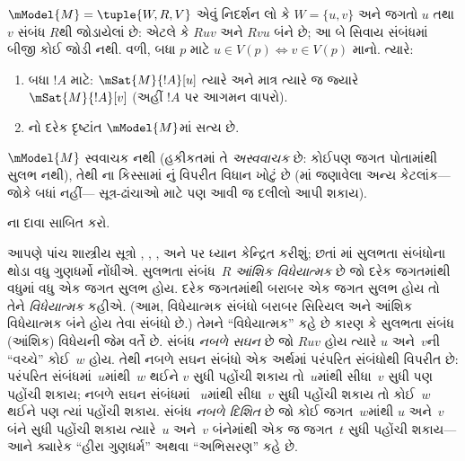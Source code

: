 \begin{prop}
  $\mModel{M} = \tuple{W, R, V}$ એવું નિદર્શન
  લો કે $W = \{u, v
  \}$ અને જગતો $u$ તથા $v$ સંબંધ $R$થી
  જોડાયેલાં છે: એટલે કે $Ruv$ અને $Rvu$ બંને છે;
  આ બે સિવાય સંબંધમાં બીજી કોઈ જોડી નથી.
  વળી, બધા $p$ માટે $u \in V(p) \Leftrightarrow v
  \in V(p)$ માનો. ત્યારે:
  \begin{enumerate}
  \item બધા $!A$ માટે: $\mSat{M}{!A}[u]$ ત્યારે અને માત્ર ત્યારે
    જ જ્યારે $\mSat{M}{!A}[v]$ (અહીં $!A$ પર આગમન વાપરો).
  \item {}નો દરેક દૃષ્ટાંત $\mModel{M}$માં સત્ય છે.
  \end{enumerate}
  $\mModel{M}$ સ્વવાચક નથી (હકીકતમાં તે
  \emph{અસ્વવાચક} છે: કોઈપણ જગત પોતામાંથી સુલભ નથી),
  તેથી ના કિસ્સામાં
  નું વિપરીત વિધાન ખોટું છે
  (માં જણાવેલા અન્ય કેટલાંક---જોકે બધાં નહીં---
  સૂત્ર-ઢાંચાઓ માટે પણ આવી જ દલીલો આપી શકાય).
\end{prop}

\begin{prob}
  ના દાવા સાબિત કરો.
\end{prob}

આપણે પાંચ શાસ્ત્રીય સૂત્રો ,
, ,  અને  પર ધ્યાન કેન્દ્રિત
કરીશું; છતાં માં સુલભતા
સંબંધોના થોડા વધુ ગુણધર્મો નોંધીએ. સુલભતા
સંબંધ~$R$ \emph{આંશિક વિધેયાત્મક} છે જો દરેક
જગતમાંથી વધુમાં વધુ એક જગત સુલભ હોય. દરેક
જગતમાંથી બરાબર એક જગત સુલભ હોય તો તેને
\emph{વિધેયાત્મક} કહીએ. (આમ, વિધેયાત્મક સંબંધો
બરાબર સિરિયલ અને આંશિક વિધેયાત્મક બંને હોય
તેવા સંબંધો છે.) તેમને ``વિધેયાત્મક'' કહે છે કારણ કે
સુલભતા સંબંધ (આંશિક) વિધેયની જેમ વર્તે છે.
સંબંધ \emph{નબળે સઘન} છે જો $Ruv$ હોય ત્યારે
$u$ અને~$v$ની ``વચ્ચે'' કોઈ~$w$ હોય. તેથી
નબળે સઘન સંબંધો એક અર્થમાં પરંપરિત સંબંધોથી
વિપરીત છે: પરંપરિત સંબંધમાં~$u$માંથી~$w$ થઈને
$v$ સુધી પહોંચી શકાય તો~$u$માંથી સીધા~$v$
સુધી પણ પહોંચી શકાય; નબળે સઘન સંબંધમાં
~$u$માંથી સીધા~$v$ સુધી પહોંચી શકાય તો
કોઈ~$w$ થઈને પણ ત્યાં પહોંચી શકાય.
સંબંધ \emph{નબળે દિશિત} છે જો કોઈ જગત~$w$માંથી
$u$ અને~$v$ બંને સુધી પહોંચી શકાય ત્યારે~$u$
અને~$v$ બંનેમાંથી એક જ જગત~$t$ સુધી પહોંચી
શકાય---આને ક્યારેક ``હીરા ગુણધર્મ'' અથવા
``અભિસરણ'' કહે છે.

